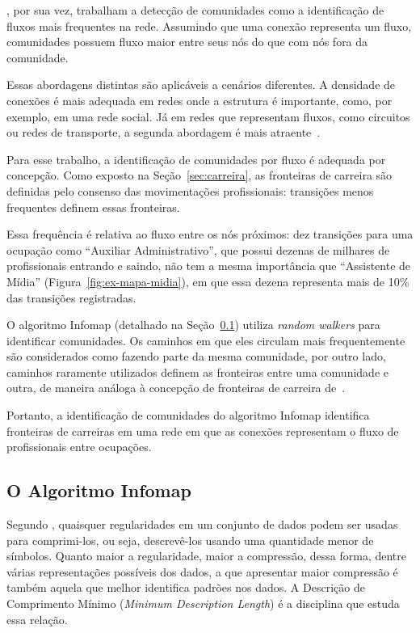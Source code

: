 \documentclass[
  article,
  11pt,
  a4paper,
  english,
  brazil,
  sumario=tradicional]{abntex2}
\begin{document}
, por sua vez, trabalham a detecção de comunidades como a identificação de fluxos mais frequentes na rede. Assumindo que uma conexão representa um fluxo, comunidades possuem fluxo maior entre seus nós do que com nós fora da comunidade.

Essas abordagens distintas são aplicáveis a cenários diferentes. A densidade de conexões é mais adequada em redes onde a estrutura é importante, como, por exemplo, em uma rede social. Já em redes que representam fluxos, como circuitos ou redes de transporte, a segunda abordagem é mais atraente~\cite{Rosvall2009-sd}.

Para esse trabalho, a identificação de comunidades por fluxo é adequada por concepção. Como exposto na Seção~\ref{sec:carreira}, as fronteiras de carreira são definidas pelo consenso das movimentações profissionais: transições menos frequentes definem essas fronteiras.

Essa frequência é relativa ao fluxo entre os nós próximos: dez transições para uma ocupação como \enquote{Auxiliar Administrativo}, que possui dezenas de milhares de profissionais entrando e saindo, não tem a mesma importância que \enquote{Assistente de Mídia} (Figura~\ref{fig:ex-mapa-midia}), em que essa dezena representa mais de 10\% das transições registradas.

O algoritmo Infomap (detalhado na Seção~\ref{sec:infomap}) utiliza \textit{random walkers} para identificar comunidades. Os caminhos em que eles circulam mais frequentemente são considerados como fazendo parte da mesma comunidade, por outro lado, caminhos raramente utilizados definem as fronteiras entre uma comunidade e outra, de maneira análoga à concepção de fronteiras de carreira de~.

Portanto, a identificação de comunidades do algoritmo Infomap identifica fronteiras de carreiras em uma rede em que as conexões representam o fluxo de profissionais entre ocupações.

\subsection{O Algoritmo Infomap} \label{sec:infomap}

Segundo , quaisquer regularidades em um conjunto de dados podem ser usadas para comprimi-los, ou seja, descrevê-los usando uma quantidade menor de símbolos. Quanto maior a regularidade, maior a compressão, dessa forma, dentre várias representações possíveis dos dados, a que apresentar maior compressão é também aquela que melhor identifica padrões nos dados. A Descrição de Comprimento Mínimo (\textit{Minimum Description Length}) é a disciplina que estuda essa relação.
\end{document}
